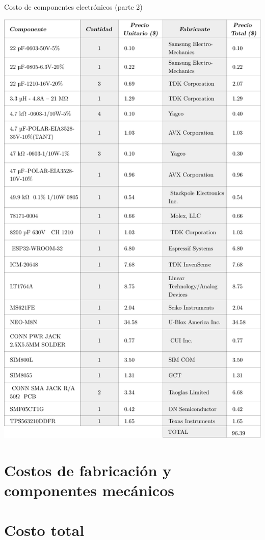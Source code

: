 \begin{table}[htbp!]
  \centering
  \caption{Costo de componentes electrónicos (parte 2)}
  \label{diag:costos_elec_2}
  \includegraphics[width=0.9\linewidth]{BOM_2.pdf}
\end{table}

\section{Costos de fabricación y componentes mecánicos}
\section{Costo total}
